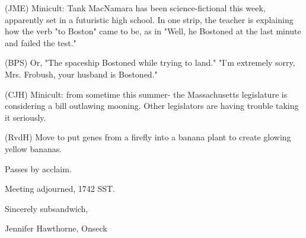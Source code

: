 \documentclass[12pt]{article}
\begin{document}
(JME) Minicult: Tank MacNamara has been science-fictional this week, apparently set in a futuristic high school. In one strip, the teacher is explaining how the verb "to Boston" came to be, as in "Well, he Bostoned at the last minute and failed the test."

(BPS) Or, "The spaceship Bostoned while trying to land." "I'm extremely sorry, Mrs. Frobush, your husband is Bostoned."

(CJH) Minicult: from sometime this summer- the Massachusetts legislature is considering a bill outlawing mooning. Other legislators are having trouble taking it seriously.

(RvdH) Move to put genes from a firefly into a banana plant to create glowing yellow bananas.

Passes by acclaim.

\vspace{12pt}

\noindent
Meeting adjourned, 1742 SST.

\vspace{18pt}

\centerline{Sincerely subsandwich,}
\centerline{Jennifer Hawthorne, Onseck}
\end{document}
